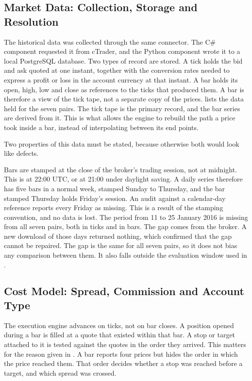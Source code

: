 \subsection{Market Data: Collection, Storage and Resolution}

The historical data was collected through the same connector. The C\# component requested it from cTrader, and the Python component wrote it to a local PostgreSQL database. Two types of record are stored. A tick holds the bid and ask quoted at one instant, together with the conversion rates needed to express a profit or loss in the account currency at that instant. A bar holds its open, high, low and close as references to the ticks that produced them. A bar is therefore a view of the tick tape, not a separate copy of the prices.  lists the data held for the seven pairs. The tick tape is the primary record, and the bar series are derived from it. This is what allows the engine to rebuild the path a price took inside a bar, instead of interpolating between its end points.



Two properties of this data must be stated, because otherwise both would look like defects.

Bars are stamped at the close of the broker's trading session, not at midnight. This is at 22:00 UTC, or at 21:00 under daylight saving. A daily series therefore has five bars in a normal week, stamped Sunday to Thursday, and the bar stamped Thursday holds Friday's session. An audit against a calendar-day reference reports every Friday as missing. This is a result of the stamping convention, and no data is lost. The period from 11 to 25 January 2016 is missing from all seven pairs, both in ticks and in bars. The gap comes from the broker. A new download of those days returned nothing, which confirmed that the gap cannot be repaired. The gap is the same for all seven pairs, so it does not bias any comparison between them. It also falls outside the evaluation window used in .

\subsection{Cost Model: Spread, Commission and Account Type}

The execution engine advances on ticks, not on bar closes. A position opened during a bar is filled at a quote that existed within that bar. A stop or target attached to it is tested against the quotes in the order they arrived. This matters for the reason given in . A bar reports four prices but hides the order in which the price reached them. That order decides whether a stop was reached before a target, and which spread was crossed.

